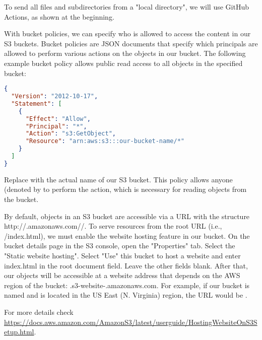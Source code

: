To send all files and subdirectories from a "local directory", we will use GitHub Actions, as shown at the beginning.

With bucket policies, we can specify who is allowed to access the content in our S3 buckets. Bucket policies are JSON 
documents that specify which principals are allowed to perform various actions on the objects in our bucket. The 
following example bucket policy allows public read access to all objects in the specified bucket:

\begin{lstlisting}[language=json]
{
  "Version": "2012-10-17",
  "Statement": [
    {
      "Effect": "Allow",
      "Principal": "*",
      "Action": "s3:GetObject",
      "Resource": "arn:aws:s3:::our-bucket-name/*"
    }
  ]
}
\end{lstlisting}

\noindent Replace  with the actual name of our S3 bucket. This policy allows anyone (denoted by 
 to perform the  action, which is necessary for reading objects from the bucket.

By default, objects in an S3 bucket are accessible via a URL with the structure http://.amazonaws.com//. To serve 
resources from the root URL (i.e., /index.html), we must enable the website hosting feature in our bucket. On the bucket 
details page in the S3 console, open the "Properties" tab. Select the "Static website hosting". Select "Use" this bucket 
to host a website and enter index.html in the root document field. Leave the other fields blank.
After that, our objects will be accessible at a website address that depends on the AWS region of the bucket: 
.s3-website-.amazonaws.com. For example, if our bucket is named  and is located in the US East (N. 
Virginia) region, the URL would be .

For more details check 
\href{https://docs.aws.amazon.com/AmazonS3/latest/userguide/HostingWebsiteOnS3Setup.html}{https://docs.aws.amazon.com/AmazonS3/latest/userguide/HostingWebsiteOnS3Setup.html}.
